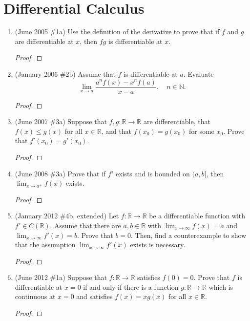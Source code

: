 \documentclass[reqno]{article}
\theoremstyle{remark}
\numberwithin{equation}{section}
\newcommand{\N}{\mathbb{N}}
\newcommand{\R}{\mathbb{R}}
\begin{document}
\section{Differential Calculus} 

\begin{enumerate}

	\item (June 2005 \#1a) Use the definition of the derivative to prove that if $f$ and $g$ are differentiable at $x$, then $fg$ is differentiable at $x$.
	
	\begin{proof}
    
    \end{proof}
	
	\item (January 2006 \#2b) Assume that $f$ is differentiable at $a$. Evaluate $$\lim_{x\to a}\frac{a^nf(x)-x^nf(a)}{x-a},\quad n\in\N.$$ 
	
	\begin{proof}
    
    \end{proof}
	
	\item (June 2007 \#3a) Suppose that $f,g:\R\to\R$ are differentiable, that $f(x)\leq g(x)$ for all $x\in\R$, and that $f(x_0)=g(x_0)$ for some $x_0$. Prove that $f'(x_0)=g'(x_0)$.
	
	\begin{proof}
    
    \end{proof}
	
	\item (June 2008 \#3a) Prove that if $f'$ exists and is bounded on $(a,b]$, then $\lim_{x\to a^+}f(x)$ exists.
	
	\begin{proof}
    
    \end{proof}
	
	\item (January 2012 \#4b, extended) Let $f:\R\to\R$ be a differentiable function with $f'\in C(\R)$. Assume that there are $a,b\in\R$ with $\lim_{x\to\infty}f(x)=a$ and $\lim_{x\to\infty}f'(x)=b$. Prove that $b=0$. 
	Then, find a counterexample to show that the assumption  $\lim_{x\to\infty}f'(x)$ exists is necessary.
	
	\begin{proof}
    
    \end{proof}
	
	\item (June 2012 \#1a) Suppose that $f:\R\to\R$ satisfies $f(0)=0$. Prove that $f$ is differentiable at $x=0$ if and only if there is a function $g:\R\to\R$ which is continuous at $x=0$ and satisfies $f(x)=xg(x)$ for all $x\in\R$.
	
	\begin{proof}
    
    \end{proof}
    
\end{enumerate}
\end{document}
